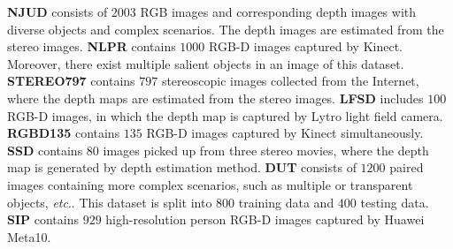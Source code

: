 \documentclass[journal]{IEEEtran}
\newcommand{\etc}{\textit{etc}.}
\begin{document}
\textbf{NJUD} \cite{ju2014depth} consists of $2003$ RGB images and corresponding depth images with diverse objects and complex scenarios. The depth images are estimated from the stereo images.
\textbf{NLPR} \cite{peng2014rgbd} contains $1000$ RGB-D images captured by Kinect. Moreover, there exist multiple salient objects in an image of this dataset.
\textbf{STEREO797} \cite{niu2012leveraging} contains $797$ stereoscopic images collected from the Internet, where the depth maps are estimated from the stereo images.
\textbf{LFSD} \cite{li2014saliency} includes $100$ RGB-D images, in which the depth map is captured by Lytro light field camera.
\textbf{RGBD135} \cite{cheng2014depth} contains $135$ RGB-D images captured by Kinect simultaneously.
\textbf{SSD} \cite{zhu2017three} contains $80$ images picked up from three stereo movies, where the depth map is generated by depth estimation method.
\textbf{DUT} \cite{Piao_2019_ICCV} consists of $1200$ paired images containing more complex scenarios, such as multiple or transparent objects, \etc.
		This dataset is split into $800$ training data and $400$ testing data.
\textbf{SIP} \cite{fan2019D3Net} contains $929$ high-resolution person RGB-D images captured by Huawei Meta10.
\end{document}

